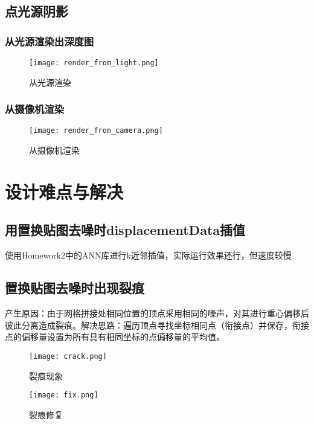 \documentclass[14pt]{scrartcl} %
\begin{document}
\pagebreak
\subsection{点光源阴影}
\subsubsection{从光源渲染出深度图}
\begin{figure}[h] %
	\centering
	\texttt{[image: render\_from\_light.png]} %
	\caption{从光源渲染}
\end{figure}

\subsubsection{从摄像机渲染}
\begin{figure}[h] %
	\centering
	\texttt{[image: render\_from\_camera.png]} %
	\caption{从摄像机渲染}
\end{figure}



\pagebreak
\section{设计难点与解决}

\subsection{用置换贴图去噪时displacementData插值}
使用Homework2中的ANN库进行k近邻插值，实际运行效果还行，但速度较慢

\subsection{置换贴图去噪时出现裂痕}
产生原因：由于网格拼接处相同位置的顶点采用相同的噪声，对其进行重心偏移后彼此分离造成裂痕。解决思路：遍历顶点寻找坐标相同点（衔接点）并保存，衔接点的偏移量设置为所有具有相同坐标的点偏移量的平均值。

\begin{figure}[h] %
	\centering
	\texttt{[image: crack.png]} %
	\caption{裂痕现象}
		\centering
	\texttt{[image: fix.png]} %
	\caption{裂痕修复}
\end{figure}
\end{document}

